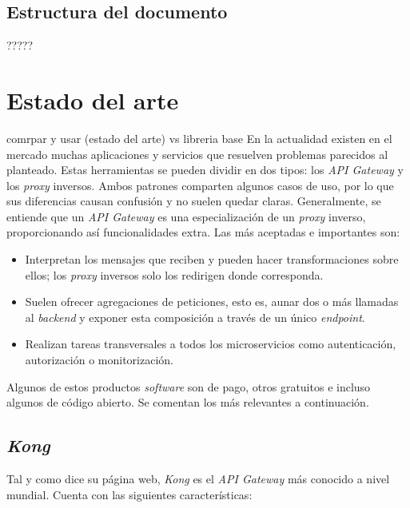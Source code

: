 \documentclass[11pt,spanish,listoffigures]{tfgetsinf}
\begin{document}
\section{Estructura del documento}

?????


\chapter{Estado del arte}

comrpar y usar (estado del arte) vs libreria base
En la actualidad existen en el mercado muchas aplicaciones y servicios que resuelven problemas parecidos al planteado. Estas herramientas se pueden dividir en dos tipos: los \emph{API Gateway} y los \emph{proxy} inversos. Ambos patrones comparten algunos casos de uso, por lo que sus diferencias causan confusión y no suelen quedar claras. Generalmente, se entiende que un \emph{API Gateway} es una especialización de un \emph{proxy} inverso, proporcionando así funcionalidades extra. Las más aceptadas e importantes son:

\begin{itemize}

	\item Interpretan los mensajes que reciben y pueden hacer transformaciones sobre ellos; los \emph{proxy} inversos solo los redirigen donde corresponda.
	\item Suelen ofrecer agregaciones de peticiones, esto es, aunar dos o más llamadas al \emph{backend} y exponer esta composición a través de un único \emph{endpoint}.
	\item Realizan tareas transversales a todos los microservicios como autenticación, autorización o monitorización.

\end{itemize}

Algunos de estos productos \emph{software} son de pago, otros gratuitos e incluso algunos de código abierto. Se comentan los más relevantes a continuación.

\section{\emph{Kong}}
Tal y como dice su página web, \emph{Kong} \cite{Kong} es el \emph{API Gateway} más conocido a nivel mundial. Cuenta con las siguientes características:
\end{document}

